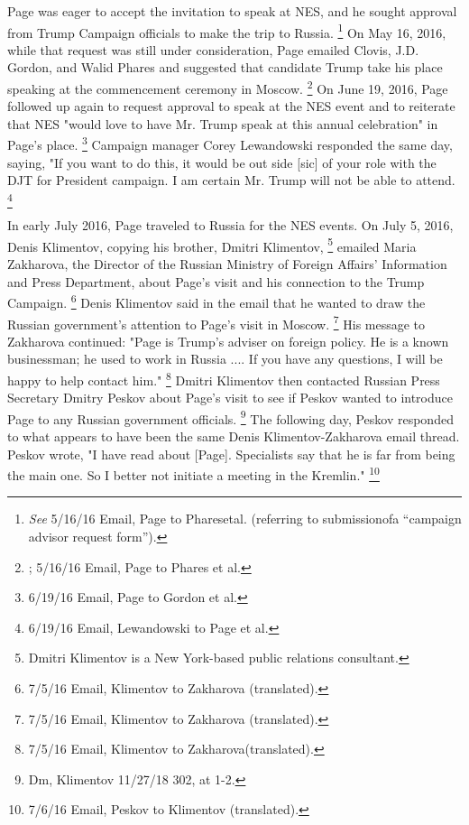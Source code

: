 Page was eager to accept the invitation to speak at NES, and he sought approval from Trump Campaign officials to make the trip to Russia.%
\footnote{\textit{See} 5/16/16 Email, Page to Pharesetal.
(referring to submissionofa “campaign advisor request form”).}
On May 16, 2016, while that request was still under consideration, Page emailed Clovis, J.D. Gordon, and Walid Phares and suggested that candidate Trump take his place speaking at the commencement ceremony in Moscow.%
\footnote{; 5/16/16 Email, Page to Phares et al.}
On June 19, 2016, Page followed up again to request approval to speak at the NES event and to reiterate that NES "would love to have Mr. Trump speak at this annual celebration" in Page's place.%
\footnote{6/19/16 Email, Page to Gordon et al.}
Campaign manager Corey Lewandowski responded the same day, saying, "If you want to do this, it would be out side [sic] of your role with the DJT for President campaign. I am certain Mr. Trump will not be able to attend.%
\footnote{6/19/16 Email, Lewandowski to Page et al.}

In early July 2016, Page traveled to Russia for the NES events.
On July 5, 2016, Denis Klimentov, copying his brother, Dmitri Klimentov,%
\footnote{Dmitri Klimentov is a New York-based public relations consultant.}
emailed Maria Zakharova, the Director of the Russian Ministry of Foreign Affairs' Information and Press Department, about Page's visit and his connection to the Trump Campaign.%
\footnote{7/5/16 Email, Klimentov to Zakharova (translated).}
Denis Klimentov said in the email that he wanted to draw the Russian government's attention to Page's visit in Moscow.%
\footnote{7/5/16 Email, Klimentov to Zakharova (translated).}
His message to Zakharova continued: "Page is Trump's adviser on foreign policy.
He is a known businessman; he used to work in Russia ....
If you have any questions, I will be happy to help contact him."%
\footnote{7/5/16 Email, Klimentov to Zakharova(translated).}
Dmitri Klimentov then contacted Russian Press Secretary Dmitry Peskov about Page's visit to see if Peskov wanted to introduce Page to any Russian government officials.%
\footnote{Dm, Klimentov 11/27/18 302, at 1-2.}
The following day, Peskov responded to what appears to have been the same Denis Klimentov-Zakharova email thread.
Peskov wrote, "I have read about [Page].
Specialists say that he is far from being the main one.
So I better not initiate a meeting in the Kremlin."%
\footnote{7/6/16 Email, Peskov to Klimentov (translated).}

